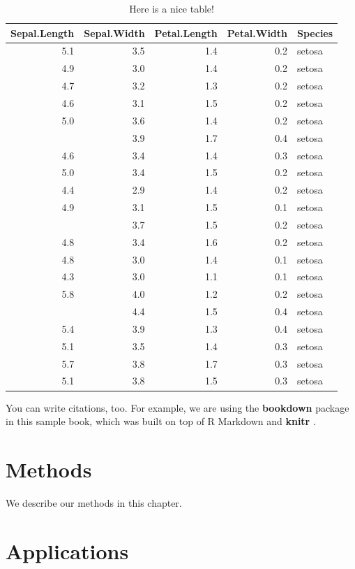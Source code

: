 \documentclass[]{book}
\begin{document}
\begin{table}[t]

\caption{\label{tab:nice-tab}Here is a nice table!}
\centering
\begin{tabular}{rrrrl}
\toprule
Sepal.Length & Sepal.Width & Petal.Length & Petal.Width & Species\\
\midrule
5.1 & 3.5 & 1.4 & 0.2 & setosa\\
4.9 & 3.0 & 1.4 & 0.2 & setosa\\
4.7 & 3.2 & 1.3 & 0.2 & setosa\\
4.6 & 3.1 & 1.5 & 0.2 & setosa\\
5.0 & 3.6 & 1.4 & 0.2 & setosa\\
\addlinespace
5.4 & 3.9 & 1.7 & 0.4 & setosa\\
4.6 & 3.4 & 1.4 & 0.3 & setosa\\
5.0 & 3.4 & 1.5 & 0.2 & setosa\\
4.4 & 2.9 & 1.4 & 0.2 & setosa\\
4.9 & 3.1 & 1.5 & 0.1 & setosa\\
\addlinespace
5.4 & 3.7 & 1.5 & 0.2 & setosa\\
4.8 & 3.4 & 1.6 & 0.2 & setosa\\
4.8 & 3.0 & 1.4 & 0.1 & setosa\\
4.3 & 3.0 & 1.1 & 0.1 & setosa\\
5.8 & 4.0 & 1.2 & 0.2 & setosa\\
\addlinespace
5.7 & 4.4 & 1.5 & 0.4 & setosa\\
5.4 & 3.9 & 1.3 & 0.4 & setosa\\
5.1 & 3.5 & 1.4 & 0.3 & setosa\\
5.7 & 3.8 & 1.7 & 0.3 & setosa\\
5.1 & 3.8 & 1.5 & 0.3 & setosa\\
\bottomrule
\end{tabular}
\end{table}

You can write citations, too. For example, we are using the
\textbf{bookdown} package \citep{R-bookdown} in this sample book, which
was built on top of R Markdown and \textbf{knitr} \citep{xie2015}.

\chapter{Methods}\label{methods}

We describe our methods in this chapter.

\chapter{Applications}\label{applications}
\end{document}
